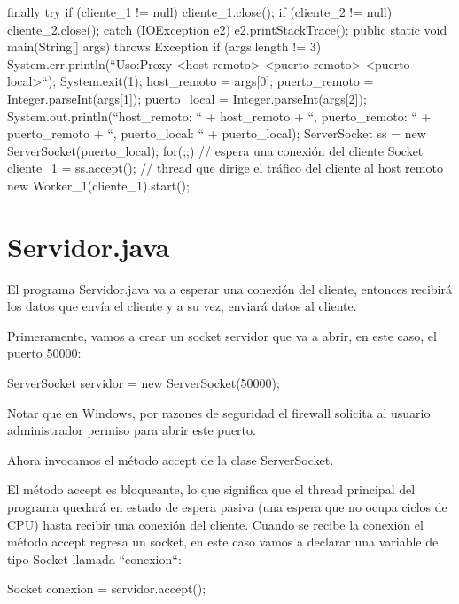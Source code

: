 \begin{SourceCode}
{{{      finally
      {
        try
        {
          if (cliente_1 != null) cliente_1.close();
          if (cliente_2 != null) cliente_2.close();
        }
        catch (IOException e2)
        {
          e2.printStackTrace();
        }
      }
    }
  }
  public static void main(String[] args) throws Exception
  {
    if (args.length != 3)
    { 
      System.err.println(``Uso:\njava Proxy <host-remoto> <puerto-remoto> <puerto-local>``);
      System.exit(1);
    }
    host_remoto = args[0];
    puerto_remoto = Integer.parseInt(args[1]);
    puerto_local = Integer.parseInt(args[2]);
    System.out.println(``host_remoto: `` + host_remoto + ``, puerto_remoto: `` + puerto_remoto + ``, puerto_local: `` + puerto_local);
    ServerSocket ss = new ServerSocket(puerto_local);
    for(;;)
    {
      // espera una conexión del cliente
      Socket cliente_1 = ss.accept();
      // thread que dirige el tráfico del cliente al host remoto
      new Worker_1(cliente_1).start();
    }
  }
}
\end{SourceCode}

\chapter{Servidor.java}

El programa Servidor.java va a esperar una conexión del cliente, entonces recibirá los datos que envía el cliente y a su vez, enviará datos al cliente.

Primeramente, vamos a crear un socket servidor que va a abrir, en este caso, el puerto 50000:

\begin{SourceCode}
ServerSocket servidor = new ServerSocket(50000);
\end{SourceCode}

Notar que en Windows, por razones de seguridad el firewall solicita al usuario administrador permiso para abrir este puerto.

Ahora invocamos el método accept de la clase ServerSocket.

El método accept es bloqueante, lo que significa que el thread principal del programa quedará en estado de espera pasiva (una espera que no ocupa ciclos de CPU) hasta recibir una conexión del cliente. Cuando se recibe la conexión el método accept regresa un socket, en este caso vamos a declarar una variable de tipo Socket llamada ``conexion``:

\begin{SourceCode}
Socket conexion = servidor.accept();
\end{SourceCode}

